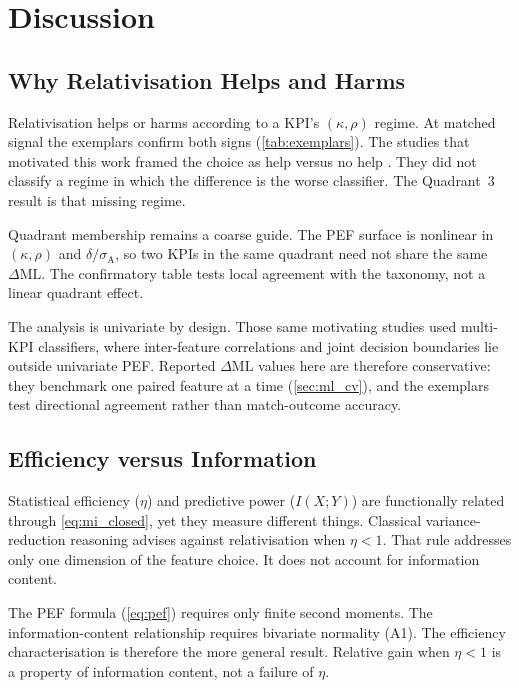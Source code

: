 \section{Discussion}
\label{sec:discussion}

\subsection{Why Relativisation Helps and Harms}

Relativisation helps or harms according to a KPI's $(\kappa,\rho)$ regime. At matched signal the exemplars confirm both signs (\cref{tab:exemplars}). The studies that motivated this work framed the choice as help versus no help \parencite{bennett2019descriptive,bennett2021predicting,mosey2020,scott2023urc,scott2023womens}. They did not classify a regime in which the difference is the worse classifier. The Quadrant~3 result is that missing regime.

Quadrant membership remains a coarse guide. The PEF surface is nonlinear in $(\kappa,\rho)$ and $\delta/\sigma_{\mathrm{A}}$, so two KPIs in the same quadrant need not share the same $\Delta\mathrm{ML}$. The confirmatory table tests local agreement with the taxonomy, not a linear quadrant effect.

The analysis is univariate by design. Those same motivating studies used multi-KPI classifiers, where inter-feature correlations and joint decision boundaries lie outside univariate PEF. Reported $\Delta\mathrm{ML}$ values here are therefore conservative: they benchmark one paired feature at a time (\cref{sec:ml_cv}), and the exemplars test directional agreement rather than match-outcome accuracy.

\subsection{Efficiency versus Information}

Statistical efficiency ($\eta$) and predictive power ($I(X;Y)$) are functionally related through \cref{eq:mi_closed}, yet they measure different things. Classical variance-reduction reasoning advises against relativisation when $\eta<1$. That rule addresses only one dimension of the feature choice. It does not account for information content.

The PEF formula (\cref{eq:pef}) requires only finite second moments. The information-content relationship requires bivariate normality (A1). The efficiency characterisation is therefore the more general result. Relative gain when $\eta<1$ is a property of information content, not a failure of $\eta$.

